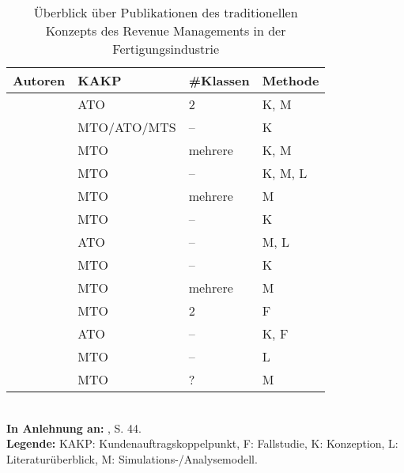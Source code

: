 \begin{table}[h!]
  \begin{center}
    \caption{Überblick über Publikationen des traditionellen Konzepts des Revenue Managements in der Fertigungsindustrie}  \label{Überblick}
    \vspace*{3mm}
    \begin{tabular}{llll}   %
     Autoren & KAKP  & \#Klassen & Methode  \\ \hline
     \cite{deBHarris1995299} &      ATO          &  2  &  K, M \\
      \cite{Kalyan:2002aa}      &      MTO/ATO/MTS          &  --  &  K \\
                \cite{rehkopf:2005aa}   &      MTO          &  mehrere &  K, M \\
                      \cite{rehkopf2007revenue}    &      MTO          &  --  &  K, M, L \\
                               \cite{Spengler:2007aa}   &    MTO            & mehrere & M  \\
          \cite{kimms2005branchenverg} & MTO & -- & K \\
          \cite{guhlich2015revenue} & ATO & -- & M, L \\
          \cite{kolisch2006revenue} & MTO & -- & K \\
              \cite{DECI:DECI074}  &      MTO          &  mehrere  &  M \\
          \cite{kuhn2004revenue} & MTO & 2 & F \\
        \cite{Specht:2008aa} &        ATO    &  --  & K, F  \\
        \cite{quante2009revenue} & MTO & -- & L \\    
          \cite{petrick2012using}      &      MTO          &  ?  &  M \\\hline
    \end{tabular} \\[3mm]
    {\footnotesize \textbf{In Anlehnung an:} \cite{quante2009management}, S. 44.}\\
        {\footnotesize \textbf{Legende:} KAKP: Kundenauftragskoppelpunkt, F: Fallstudie, K: Konzeption, L: Literaturüberblick, M: Simulations-/Analysemodell. }   %
  \end{center}
\end{table}

